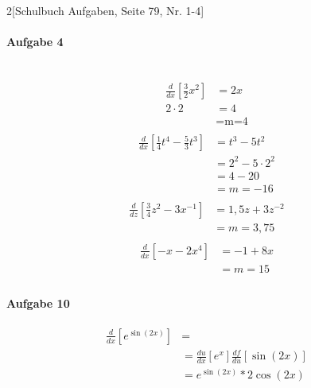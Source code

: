 \documentclass{book}
\begin{document}
\begin{multicols}{2}[Schulbuch Aufgaben, Seite 79, Nr. 1-4]
\paragraph{Aufgabe 4} %
\label{par:aufgabe-vier}
\\
\begin{align*}
\frac{d}{dx}\left[\frac{3}{2}x^2\right]&=2x\\
2\cdot 2 &= 4\\
    &=\text{m=4}\\
\end{align*}
\begin{align*}
 \frac{d}{dx}\left[\frac{1}{4}t^4-\frac{5}{3}t^3\right]&=t^3-5t^2\\
 &=2^2-5\cdot 2^2\\
 &=4-20\\
 &=m=-16\\
\end{align*}
\begin{align*}
  \frac{d}{dz}\left[\frac{3}{4}z^2-3x^{-1}\right] &= 1,5z+3z^{-2}\\
  &=m=3,75\\
\end{align*}
\begin{align*}
 \frac{d}{dx}\left[-x-2x^4\right] &=-1+8x\\
 &=m=15\\
\end{align*}
\paragraph{Aufgabe 10} 
\label{par:Aufgabe 10}
\begin{align*}
\frac{d}{dx}\left[e^{\sin(2x)}\right]&=\\
&=\frac{du}{dx}\left[e^x\right]\frac{df}{du}\left[\sin(2x)\right]\\
&=e^{\sin(2x)}*2\cos(2x)\\
\end{align*}

\end{multicols}
\end{document}
